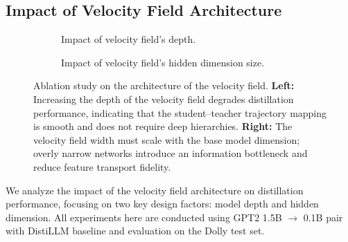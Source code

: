 \documentclass{article} %
\theoremstyle{definition}
\theoremstyle{remark}
\begin{document}
\subsection{Impact of Velocity Field Architecture}
\label{app:velofieldarch}
\begin{figure}[h]
\centering

\begin{subfigure}[t]{0.48\linewidth}
\centering
{}
\caption{Impact of velocity field's depth.}
\end{subfigure}
\hfill
\begin{subfigure}[t]{0.48\linewidth}
\centering
{}
\caption{Impact of velocity field's hidden dimension size.}
\end{subfigure}

\caption{Ablation study on the architecture of the velocity field. 
\textbf{Left:} Increasing the depth of the velocity field degrades distillation performance, indicating that the student--teacher trajectory mapping is smooth and does not require deep hierarchies. 
\textbf{Right:} The velocity field width must scale with the base model dimension; overly narrow networks introduce an information bottleneck and reduce feature transport fidelity.}
\label{fig:velocity_ablation}
\end{figure}
We analyze the impact of the velocity field architecture on distillation performance, focusing on two key design factors: model depth and hidden dimension. All experiments here are conducted using GPT2 1.5B $\rightarrow$ 0.1B pair with DistiLLM baseline and evaluation on the Dolly test set.
\end{document}

